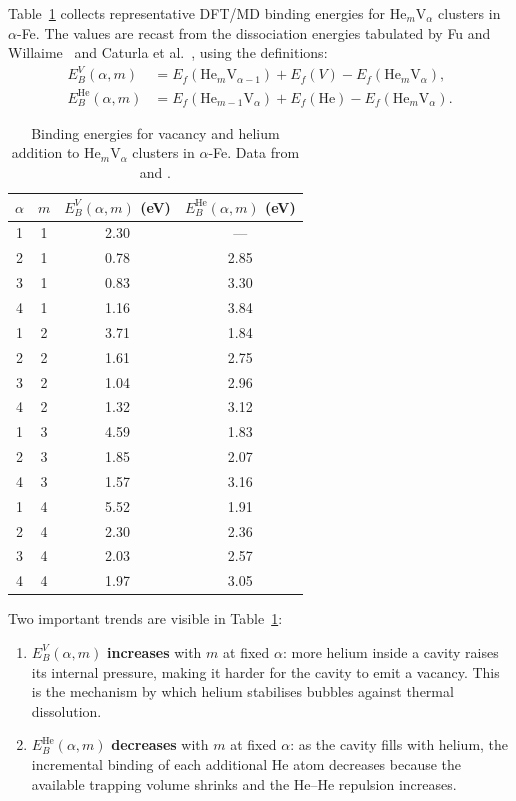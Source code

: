 \documentclass[pdflatex,sn-basic]{sn-jnl} %
\begin{document}
Table~\ref{tab:HeVacBindingFe} collects representative DFT/MD binding energies
for He$_m$V$_\alpha$ clusters in $\alpha$-Fe. The values are recast from the
dissociation energies tabulated by Fu and Willaime~\citep{Fu2005He} and
Caturla et al.~\citep{Caturla2008HeKineticModelling}, using the definitions:
\begin{align}
  E_B^{V}(\alpha,m) &= E_f(\mathrm{He}_m\mathrm{V}_{\alpha-1})
                      + E_f(V) - E_f(\mathrm{He}_m\mathrm{V}_\alpha),
                      \label{eq:EbV_def} \\
  E_B^{\mathrm{He}}(\alpha,m) &= E_f(\mathrm{He}_{m-1}\mathrm{V}_\alpha)
                      + E_f(\mathrm{He}) - E_f(\mathrm{He}_m\mathrm{V}_\alpha).
                      \label{eq:EbHe_def}
\end{align}

\begin{table}[htbp]
\centering
\caption{Binding energies for vacancy and helium addition to
He$_m$V$_\alpha$ clusters in $\alpha$-Fe. Data from
\citet{Fu2005He} and
\citet{Caturla2008HeKineticModelling}.}
\label{tab:HeVacBindingFe}
\begin{tabular}{cccc}
\toprule
$\alpha$ & $m$ & $E_B^{V}(\alpha,m)$ (eV) & $E_B^{\mathrm{He}}(\alpha,m)$ (eV) \\
\midrule
1 & 1 & 2.30 & --- \\
2 & 1 & 0.78 & 2.85 \\
3 & 1 & 0.83 & 3.30 \\
4 & 1 & 1.16 & 3.84 \\
1 & 2 & 3.71 & 1.84 \\
2 & 2 & 1.61 & 2.75 \\
3 & 2 & 1.04 & 2.96 \\
4 & 2 & 1.32 & 3.12 \\
1 & 3 & 4.59 & 1.83 \\
2 & 3 & 1.85 & 2.07 \\
4 & 3 & 1.57 & 3.16 \\
1 & 4 & 5.52 & 1.91 \\
2 & 4 & 2.30 & 2.36 \\
3 & 4 & 2.03 & 2.57 \\
4 & 4 & 1.97 & 3.05 \\
\bottomrule
\end{tabular}
\end{table}

Two important trends are visible in Table~\ref{tab:HeVacBindingFe}:
\begin{enumerate}
    \item $E_B^V(\alpha,m)$ \textbf{increases} with $m$ at fixed $\alpha$:
    more helium inside a cavity raises its internal pressure, making it harder
    for the cavity to emit a vacancy. This is the mechanism by which helium
    stabilises bubbles against thermal dissolution.
    
    \item $E_B^{\mathrm{He}}(\alpha,m)$ \textbf{decreases} with $m$ at fixed
    $\alpha$: as the cavity fills with helium, the incremental binding of
    each additional He atom decreases because the available trapping volume
    shrinks and the He–He repulsion increases.
\end{enumerate}
\end{document}
